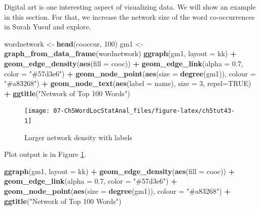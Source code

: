 \documentclass[
]{article}
\newenvironment{Shaded}{\begin{snugshade}}{\end{snugshade}}
\newcommand{\AttributeTok}[1]{\textcolor[rgb]{0.13,0.29,0.53}{#1}}
\newcommand{\ConstantTok}[1]{\textcolor[rgb]{0.56,0.35,0.01}{#1}}
\newcommand{\DecValTok}[1]{\textcolor[rgb]{0.00,0.00,0.81}{#1}}
\newcommand{\FloatTok}[1]{\textcolor[rgb]{0.00,0.00,0.81}{#1}}
\newcommand{\FunctionTok}[1]{\textcolor[rgb]{0.13,0.29,0.53}{\textbf{#1}}}
\newcommand{\NormalTok}[1]{#1}
\newcommand{\OtherTok}[1]{\textcolor[rgb]{0.56,0.35,0.01}{#1}}
\newcommand{\SpecialCharTok}[1]{\textcolor[rgb]{0.81,0.36,0.00}{\textbf{#1}}}
\newcommand{\StringTok}[1]{\textcolor[rgb]{0.31,0.60,0.02}{#1}}
\begin{document}
Digital art is one interesting aspect of visualizing data. We will show an example in this section. For that, we increase the network size of the word co-occurrences in Surah Yusuf and explore.

\begin{Shaded}
\begin{Highlighting}[]
\NormalTok{wordnetwork }\OtherTok{\textless{}{-}} \FunctionTok{head}\NormalTok{(cooccur, }\DecValTok{100}\NormalTok{)}
\NormalTok{gm1 }\OtherTok{\textless{}{-}} \FunctionTok{graph\_from\_data\_frame}\NormalTok{(wordnetwork)}
\FunctionTok{ggraph}\NormalTok{(gm1, }\AttributeTok{layout =} \StringTok{\textquotesingle{}kk\textquotesingle{}}\NormalTok{) }\SpecialCharTok{+} 
      \FunctionTok{geom\_edge\_density}\NormalTok{(}\FunctionTok{aes}\NormalTok{(}\AttributeTok{fill =}\NormalTok{ cooc)) }\SpecialCharTok{+} 
      \FunctionTok{geom\_edge\_link}\NormalTok{(}\AttributeTok{alpha =} \FloatTok{0.7}\NormalTok{, }\AttributeTok{color =} \StringTok{"\#57d3e6"}\NormalTok{) }\SpecialCharTok{+}
      \FunctionTok{geom\_node\_point}\NormalTok{(}\FunctionTok{aes}\NormalTok{(}\AttributeTok{size =} \FunctionTok{degree}\NormalTok{(gm1)), }\AttributeTok{colour =} \StringTok{"\#a83268"}\NormalTok{) }\SpecialCharTok{+}
      \FunctionTok{geom\_node\_text}\NormalTok{(}\FunctionTok{aes}\NormalTok{(}\AttributeTok{label =}\NormalTok{ name), }\AttributeTok{size =} \DecValTok{3}\NormalTok{, }\AttributeTok{repel=}\ConstantTok{TRUE}\NormalTok{) }\SpecialCharTok{+}
      \FunctionTok{ggtitle}\NormalTok{(}\StringTok{"Network of Top 100 Words"}\NormalTok{)}
\end{Highlighting}
\end{Shaded}

\begin{figure}

{\centering \texttt{[image: 07-Ch5WordLocStatAnal\_files/figure-latex/ch5tut43-1]} 

}

\caption{Larger network density with labels}\label{fig:ch5tut43}
\end{figure}

Plot output is in Figure \ref{fig:ch5tut43}.

\begin{Shaded}
\begin{Highlighting}[]
\FunctionTok{ggraph}\NormalTok{(gm1, }\AttributeTok{layout =} \StringTok{\textquotesingle{}kk\textquotesingle{}}\NormalTok{) }\SpecialCharTok{+} 
      \FunctionTok{geom\_edge\_density}\NormalTok{(}\FunctionTok{aes}\NormalTok{(}\AttributeTok{fill =}\NormalTok{ cooc)) }\SpecialCharTok{+} 
      \FunctionTok{geom\_edge\_link}\NormalTok{(}\AttributeTok{alpha =} \FloatTok{0.7}\NormalTok{, }\AttributeTok{color =} \StringTok{"\#57d3e6"}\NormalTok{) }\SpecialCharTok{+}
      \FunctionTok{geom\_node\_point}\NormalTok{(}\FunctionTok{aes}\NormalTok{(}\AttributeTok{size =} \FunctionTok{degree}\NormalTok{(gm1)),}
                      \AttributeTok{colour =} \StringTok{"\#a83268"}\NormalTok{) }\SpecialCharTok{+}
      \FunctionTok{ggtitle}\NormalTok{(}\StringTok{"Network of Top 100 Words"}\NormalTok{)}
\end{Highlighting}
\end{Shaded}
\end{document}

